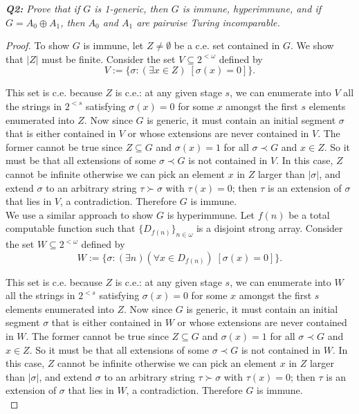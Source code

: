 \documentclass{article}
\begin{document}
\it \textbf{Q2:} Prove that if $G$ is 1-generic, then $G$ is immune,
  hyperimmune, and if $G=A_0\oplus A_1$, then $A_0$ and $A_1$ are pairwise
  Turing incomparable.

  \begin{proof}
    To show $G$ is immune, let $Z\neq\emptyset$ be a c.e. set contained in
    $G$. We show that $|Z|$ must be finite. Consider the set $V\subseteq
    2^{<\omega}$ defined by
    \[V:= \{\sigma: (\exists x\in Z)\; [\sigma(x)=0]\}.\]

    This set is c.e. because $Z$ is c.e.: at any given stage $s$, we can
    enumerate into $V$ all the strings in $2^{<s}$ satisfying $\sigma(x)=0$
    for some $x$ amongst the first $s$ elements enumerated into $Z$. Now
    since $G$ is generic, it must contain an initial segment $\sigma$
    that is either contained in $V$ or whose extensions are never
    contained in $V$. The former cannot be true since $Z\subseteq G$ and
    $\sigma(x)=1$ for all $\sigma\prec G$ and $x\in Z$. So it must be
    that all extensions of some $\sigma\prec G$ is not contained in $V$. In
    this case, $Z$ cannot be infinite otherwise we can pick an element $x$
    in $Z$ larger than $|\sigma|$, and extend $\sigma$ to an arbitrary
    string $\tau\succ\sigma$ with $\tau(x)=0$; then $\tau$ is an extension
    of $\sigma$ that lies in $V$, a contradiction. Therefore $G$ is immune.
    \\

    We use a similar approach to show $G$ is hyperimmune. Let $f(n)$ be a
    total computable function such that $\{D_{f(n)}\}_{n\in\omega}$ is a
    disjoint strong array. Consider the set $W\subseteq 2^{<\omega}$
    defined by
    \[W:= \{\sigma: (\exists n)(\forall x\in D_{f(n)})\;
    [\sigma(x)=0]\}.\]

    This set is c.e. because $Z$ is c.e.: at any given stage $s$, we can
    enumerate into $W$ all the strings in $2^{<s}$ satisfying $\sigma(x)=0$
    for some $x$ amongst the first $s$ elements enumerated into $Z$. Now
    since $G$ is generic, it must contain an initial segment $\sigma$
    that is either contained in $W$ or whose extensions are never
    contained in $W$. The former cannot be true since $Z\subseteq G$ and
    $\sigma(x)=1$ for all $\sigma\prec G$ and $x\in Z$. So it must be
    that all extensions of some $\sigma\prec G$ is not contained in $W$. In
    this case, $Z$ cannot be infinite otherwise we can pick an element $x$
    in $Z$ larger than $|\sigma|$, and extend $\sigma$ to an arbitrary
    string $\tau\succ\sigma$ with $\tau(x)=0$; then $\tau$ is an extension
    of $\sigma$ that lies in $W$, a contradiction. Therefore $G$ is immune.
    \\
  \end{proof}
\end{document}
